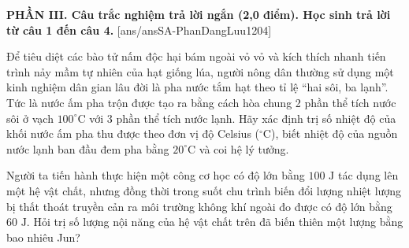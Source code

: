 
\noindent \textbf{PHẦN III. Câu trắc nghiệm trả lời ngắn (2,0 điểm). Học sinh trả lời từ câu 1 đến câu 4.}
[ans/ansSA-PhanDangLuu1204]

\begin{ex}	Để tiêu diệt các bào tử nấm độc hại bám ngoài vỏ vỏ và kích thích nhanh tiến trình nảy mầm tự nhiên của hạt giống lúa, người nông dân thường sử dụng một kinh nghiệm dân gian lâu đời là pha nước tắm hạt theo tỉ lệ “hai sôi, ba lạnh”. Tức là nước ấm pha trộn được tạo ra bằng cách hòa chung 2 phần thể tích nước sôi ở vạch $100^\circ\text{C}$ với 3 phần thể tích nước lạnh. Hãy xác định trị số nhiệt độ của khối nước ấm pha thu được theo đơn vị độ Celsius ($^\circ\text{C}$), biết nhiệt độ của nguồn nước lạnh ban đầu đem pha bằng $20^\circ\text{C}$ và coi hệ lý tưởng.

	\par{}
\end{ex}

\begin{ex}	Người ta tiến hành thực hiện một công cơ học có độ lớn bằng $100\text{ J}$ tác dụng lên một hệ vật chất, nhưng đồng thời trong suốt chu trình biến đổi lượng nhiệt lượng bị thất thoát truyền cản ra môi trường không khí ngoài đo được có độ lớn bằng $60\text{ J}$. Hỏi trị số lượng nội năng của hệ vật chất trên đã biến thiên một lượng bằng bao nhiêu Jun?

	\par{}
\end{ex}


